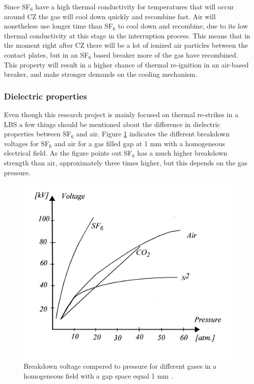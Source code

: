 \documentclass[10pt,a4paper,twoside]{article}
\begin{document}
Since SF${_6}$ have a high thermal conductivity for temperatures that will occur around CZ the gas will cool down quickly and recombine fast. Air will nonetheless use longer time than SF${_6}$ to cool down and recombine, due to its low thermal conductivity at this stage in the interruption process. This means that in the moment right after CZ there will be a lot of ionized air particles between the contact plates, but in an SF${_6}$ based breaker more of the gas have recombined. This property will result in a higher chance of thermal re-ignition in an air-based breaker, and make stronger demands on the cooling mechanism.

\subsubsection*{Dielectric properties} 

Even though this research project is mainly focused on thermal re-strikes in a LBS a few things should be mentioned about the difference in dielectric properties between SF${_6}$ and air. Figure \ref{fig:breakDownVoltage} indicates the different breakdown voltages for SF$_6$ and air for a gas filled gap at 1 mm with a homogeneous electrical field. As the figure points out SF$_6$ has a much higher breakdown strength than air, approximately three times higher, but this depends on the gas pressure.

\begin{figure}[H]
\centering
\includegraphics[scale=1]{Bilder/Discussion/Breakdown_voltage.png}
\caption{Breakdown voltage compered to pressure for different gases in a homogeneous field with a gap space equal 1 mm  \cite{bib:TET4160HVIM}.} \label{fig:breakDownVoltage}
\end{figure}
\end{document}
